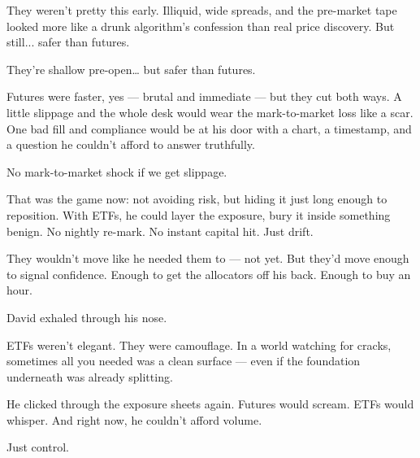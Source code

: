 They weren’t pretty this early. Illiquid, wide spreads, and the pre-market tape looked more like a drunk algorithm’s confession than real price discovery. But still... safer than futures.

They’re shallow pre-open… but safer than futures.

Futures were faster, yes — brutal and immediate — but they cut both ways. A little slippage and the whole desk would wear the mark-to-market loss like a scar. One bad fill and compliance would be at his door with a chart, a timestamp, and a question he couldn’t afford to answer truthfully.

No mark-to-market shock if we get slippage.

That was the game now: not avoiding risk, but hiding it just long enough to reposition. With ETFs, he could layer the exposure, bury it inside something benign. No nightly re-mark. No instant capital hit. Just drift.

They wouldn’t move like he needed them to — not yet. But they’d move enough to signal confidence. Enough to get the allocators off his back. Enough to buy an hour.

David exhaled through his nose.

ETFs weren’t elegant. They were camouflage. In a world watching for cracks, sometimes all you needed was a clean surface — even if the foundation underneath was already splitting.

He clicked through the exposure sheets again. Futures would scream. ETFs would whisper. And right now, he couldn’t afford volume.

Just control.



\medskip

